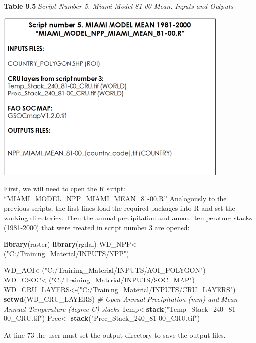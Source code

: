 \documentclass[
  10pt,
  b5paper,
]{book}
\newenvironment{Shaded}{\begin{snugshade}}{\end{snugshade}}
\newcommand{\CommentTok}[1]{\textcolor[rgb]{0.56,0.35,0.01}{\textit{#1}}}
\newcommand{\KeywordTok}[1]{\textcolor[rgb]{0.13,0.29,0.53}{\textbf{#1}}}
\newcommand{\NormalTok}[1]{#1}
\newcommand{\StringTok}[1]{\textcolor[rgb]{0.31,0.60,0.02}{#1}}
\begin{document}
\textbf{Table 9.5} \emph{Script Number 5. Miami Model 81-00 Mean. Inputs and Outputs}

\includegraphics{tables/Table_9.4.png}

First, we will need to open the R script: ``MIAMI\_MODEL\_NPP\_MIAMI\_MEAN\_81-00.R''
Analogously to the previous scripts, the first lines load the required packages into R and set the working directories. Then the annual precipitation and annual temperature stacks (1981-2000) that were created in script number 3 are opened:

\begin{Shaded}
\begin{Highlighting}[]
\KeywordTok{library}\NormalTok{(raster)}
\KeywordTok{library}\NormalTok{(rgdal)}
\NormalTok{WD_NPP<-(}\StringTok{"C:/Training_Material/INPUTS/NPP"}\NormalTok{)}

\NormalTok{WD_AOI<-(}\StringTok{"C:/Training_Material/INPUTS/AOI_POLYGON"}\NormalTok{)}
\NormalTok{WD_GSOC<-(}\StringTok{"C:/Training_Material/INPUTS/SOC_MAP"}\NormalTok{)}
\NormalTok{WD_CRU_LAYERS<-(}\StringTok{"C:/Training_Material/INPUTS/CRU_LAYERS"}\NormalTok{)}
\KeywordTok{setwd}\NormalTok{(WD_CRU_LAYERS)}
\CommentTok{# Open Annual Precipitation (mm) and Mean Annual Temperature (degree C) stacks}
\NormalTok{Temp<-}\KeywordTok{stack}\NormalTok{(}\StringTok{"Temp_Stack_240_81-00_CRU.tif"}\NormalTok{)}
\NormalTok{Prec<-}\StringTok{ }\KeywordTok{stack}\NormalTok{(}\StringTok{"Prec_Stack_240_81-00_CRU.tif"}\NormalTok{)}
\end{Highlighting}
\end{Shaded}

At line 73 the user must set the output directory to save the output files.
\end{document}
